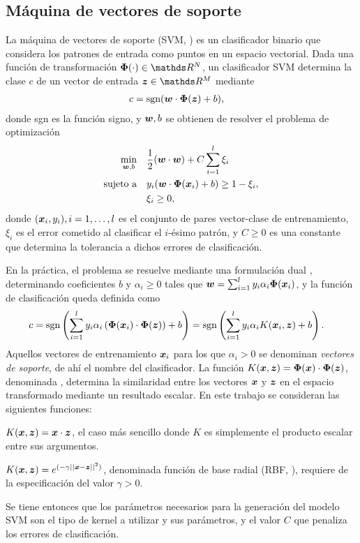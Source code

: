 \documentclass[12pt,bibliography=oldstyle,DIV=12,parskip=half-,titlepage]{scrartcl}
\begin{document}
\subsection{Máquina de vectores de soporte}
%
La máquina de vectores de soporte (SVM, )
\cite{svm} es un clasificador binario que considera los patrones de
entrada como puntos en un espacio vectorial. Dada una función de transformación
$\BPhi(\cdot)\in{}\RR^N$, un clasificador SVM determina la clase $c$ de
un vector de entrada $\zz\in\RR^M$ mediante
\begin{align}
  c &= \textrm{sgn}{\left(\boldsymbol{w}\cdot\boldsymbol{\Phi}(\boldsymbol{z})+b\right)},
\end{align}
donde sgn es la función signo, y $\boldsymbol{w},b$ se obtienen de resolver el
problema de optimización
\begin{align}
  \min_{\boldsymbol{w},b} &\quad
  \frac{1}{2}(\boldsymbol{w}\cdot\boldsymbol{w})+C\sum_{i=1}^{l}\xi_i\\
  \textrm{sujeto a} &\quad
  y_i(\boldsymbol{w}\cdot\boldsymbol{\Phi}(\boldsymbol{x}_i)+b)\geq 1-\xi_i,\\
  &\quad\xi_i\geq 0,
\end{align}
donde $(\boldsymbol{x}_i,y_i), i=1,\ldots,l$ es el conjunto de pares
vector-clase de entrenamiento, $\xi_i$ es el error cometido al
clasificar el $i$-ésimo patrón, y $C\geq0$ es una constante que
determina la tolerancia a dichos errores de clasificación.

En la práctica, el problema se resuelve mediante una formulación
dual \cite{bottou}, determinando
coeficientes $b$ y $\alpha_i\geq0$ tales que $\boldsymbol{w}=\sum_{i=1}^l
y_i\alpha_i\boldsymbol{\Phi}(\boldsymbol{x}_i)$, y la función de clasificación queda
definida como
\begin{align}
  c &= \textrm{sgn}\left(\sum_{i=1}^l
  y_i\alpha_i\left(\boldsymbol{\Phi}(\boldsymbol{x}_i)\cdot\boldsymbol{\Phi}(\boldsymbol{z})\right)+b\right) =
  \textrm{sgn}\left(\sum_{i=1}^l y_i\alpha_iK(\boldsymbol{x}_i,\boldsymbol{z})+b\right).
\end{align}
Aquellos vectores de entrenamiento $\boldsymbol{x}_i$ para los que $\alpha_i >
0$ se denominan \emph{vectores de soporte}, de ahí el nombre del
clasificador.  La función
$K(\boldsymbol{x},\boldsymbol{z})=\boldsymbol{\Phi}(\boldsymbol{x})\cdot\boldsymbol{\Phi}(\boldsymbol{z})$, denominada
, determina la similaridad entre los vectores $\boldsymbol{x}$ y
$\boldsymbol{z}$ en el espacio transformado mediante un resultado escalar. En
este trabajo se consideran las siguientes funciones:
\begin{description}
  [style=sameline,leftmargin=4em,itemsep=6pt,align=right]
  \item[Lineal:] $K(\boldsymbol{x},\boldsymbol{z})=\boldsymbol{x}\cdot\boldsymbol{z}$, el caso
    más sencillo donde $K$ es simplemente el producto escalar entre
    sus argumentos.
\item[RBF:] $K(\boldsymbol{x},\boldsymbol{z})=e^{(-\gamma||\boldsymbol{x}-\boldsymbol{z}||^2)}$,
  denominada función de base radial (RBF, ), requiere de la especificación del valor $\gamma>0$.
\end{description}
Se tiene entonces que los parámetros necesarios para la generación del
modelo SVM son el tipo de kernel a utilizar y sus parámetros, y el
valor $C$ que penaliza los errores de clasificación.
%
%
\end{document}
